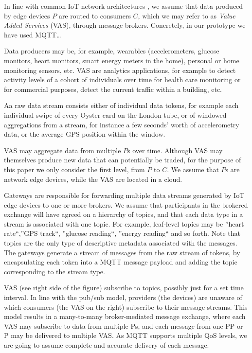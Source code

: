 \documentclass[conference]{IEEEtran}
\begin{document}
In line with common IoT network architectures , we assume that data produced by edge devices $ P $ are routed to consumers $ C $, which we may refer to as \textit{Value Added Services} (VAS), through message brokers. Concretely, in our prototype we have used MQTT… 

Data producers may be, for example, wearables (accelerometers, glucose monitors, heart monitors, smart energy meters in the home), personal or home monitoring sensors, etc.
VAS are analytics applications, for example to detect activity levels of a cohort of individuals over time for health care monitoring or for commercial purposes, detect the current traffic within a building, etc.

Aa raw data stream consists either of individual data tokens, for example each individual swipe of every Oyster card on the London tube, or of windowed aggregations from a stream, for instance a few seconds’ worth of accelerometry data, or the average GPS position within the window.

VAS may aggregate data from multiple $ P $s over time. Although VAS may themselves produce new data that can potentially be traded, for the purpose of this paper we only consider the first level, from $ P $ to $ C $. We assume that $ P $s are network edge devices, while the VAS are located in a cloud.

Gateways are responsible for forwarding multiple data streams generated by IoT edge devices to one or more brokers.
We assume that participants in the brokered exchange will have agreed on a hierarchy of topics, and that each data type in a stream is associated with one topic. For example, leaf-level topics may be ''heart rate``,''GPS track``, ''glucose reading``, ''energy reading`` and so forth. Note that topics are the only type of descriptive metadata associated with the messages.
The gateways generate a stream of messages from the raw stream of tokens, by encapsulating each token into a MQTT message payload and adding the topic corresponding to the stream type.

VAS (see right side of the figure) subscribe to topics, possibly just for a set time interval. 
In line with the pub/sub model, providers (the devices) are unaware of which consumers (the VAS on the right) subscribe to their message streams.
This model results in a many-to-many broker-mediated message exchange, where each VAS may subscribe to data from multiple Ps, and each message from one PP or P may be delivered to multiple VAS. As MQTT supports multiple QoS levels, we are going to assume complete and accurate delivery of each message.
\end{document}
